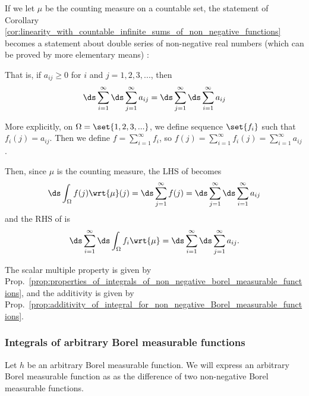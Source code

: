 \documentclass{article} %
\newcommand{\dint}{\ds\int}
\newcommand{\dsum}{\ds\sum}
\newcommand{\dmu}{\wrt{\mu}}
\begin{document}
\begin{remark}
If we let $\mu$ be the counting measure on a countable set, the statement of  Corollary \ref{cor:linearity_with_countable_infinite_sums_of_non_negative_functions} becomes a statement about double series of non-negative real numbers (which can be proved by more elementary means) \cite{rudin1987real}:

That is, if $a_{ij} \geq 0$ for $i$ and $j = 1, 2, 3, ...$, then 
\[ \ds\sum_{i=1}^\infty \ds\sum_{j=1}^\infty  a_{ij} = \ds\sum_{j=1}^\infty \ds\sum_{i=1}^\infty  a_{ij} \]

{\tiny More explicitly, on $\Omega =\set{1,2,3,...}$, we define sequence $\set{f_i}$ such that $f_i(j) = a_{ij}$.  Then we define $f = \sum_{i=1}^\infty f_i$, so $f(j) = \sum_{i=1}^\infty f_i(j) = \sum_{i=1}^\infty a_{ij}$.

Then, since $\mu$ is the counting measure, the LHS of   becomes 
\[  \dint_\Omega f(j) \dmu(j) = \dsum_{j=1}^\infty f(j) = \ds\sum_{j=1}^\infty \ds\sum_{i=1}^\infty a_{ij}\]	
and the RHS of  is 
\[ \ds\sum_{i=1}^\infty \ds\int_\Omega f_i \dmu = \ds\sum_{i=1}^\infty \ds\sum_{j=1}^\infty a_{ij}. \]
}

\end{remark}


\begin{remark}{} The scalar multiple property is given by Prop.~\ref{prop:properties_of_integrals_of_non_negative_borel_measurable_functions}, and the additivity is given by Prop.~\ref{prop:additivity_of_integral_for_non_negative_Borel_measurable_functions}.
\label{rk:integrals_are_linear_over_non_negative_Borel_measurable_function}
\end{remark}



\subsubsection{Integrals of arbitrary Borel measurable functions}

Let $h$ be an arbitrary Borel measurable function.   We will express an arbitrary Borel measurable function as as the difference of two non-negative Borel measurable functions.
\end{document}
